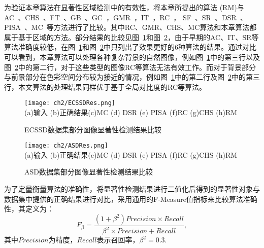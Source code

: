 为验证本章算法在显著性区域检测中的有效性，将本章所提出的算法 (RM)与AC~\cite{Achanta08}、CHS~\cite{Yan2014Hierarchical}、FT~\cite{saliencyFilter}、GB~\cite{Harel07graph-basedvisual}、GC~\cite{GC}，GMR~\cite{GMR}，IT~\cite{itti}，RC~\cite{ChengPAMI}， SF~\cite{saliencyFilter}、SR~\cite{SR}、DSR~\cite{DSR}、PISA~\cite{PISA}、MC~\cite{MC}等方法进行了比较。其中RC、GMR、CHS、MC算法和本章算法都属于基于区域的方法。部分结果的比较见图~\ref{fig:chap2:comp1}和图~\ref{fig:chap2:comp2}，由于早期的AC、IT、SR等算法准确度较低，在图~\ref{fig:chap2:comp1}和图~\ref{fig:chap2:comp2}中只列出了效果更好的6种算法的结果。通过对比可以看到，本章算法可以处理各种复杂背景的自然图像，例如图~\ref{fig:chap2:comp1}中的第三行以及图~\ref{fig:chap2:comp2}中的第二行，对于这些类型的图像RC等算法无法有效工作。而对于背景部分与前景部分在色彩空间分布较为接近的情况，例如图~\ref{fig:chap2:comp1}中的第二行及图~\ref{fig:chap2:comp2}中的第三行，本文算法的处理结果同样优于基于全局对比度的RC等算法。\par
\begin{figure}[h]
  \centering%
      {\texttt{[image: ch2/ECSSDRes.png]}}\\
(a)输入 (b)正确结果(c)MC \quad (d) DSR \quad (e) PISA \quad (f)RC \quad (g)CHS \quad (h)RM\\
  \caption{ECSSD数据集部分图像显著性检测结果比较}
  \label{fig:chap2:comp1}
\end{figure}
\begin{figure}[h]
  \centering%
      {\texttt{[image: ch2/ASDRes.png]}}\\
(a)输入 (b)正确结果(c)MC \quad (d) DSR \quad (e) PISA \quad (f)RC \quad (g)CHS \quad (h)RM\\
  \caption{ASD数据集部分图像显著性检测结果比较}
  \label{fig:chap2:comp2}
\end{figure}
为了定量衡量算法的准确性，将显著性检测结果进行二值化后得到的显著性对象与数据集中提供的正确结果进行对比，采用通用的F-Measure值指标来比较算法准确性，其定义为：
$$F_{\beta} = \frac{(1+\beta^2)Precision \times Recall}{\beta^2 \times Precision + Recall},$$
其中$Precision$为精度，$Recall$表示召回率，$\beta^2=0.3$. \par

